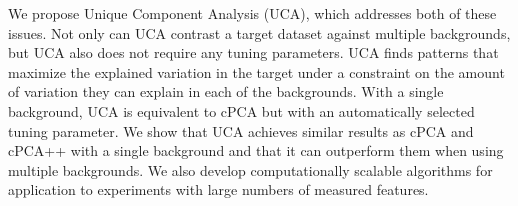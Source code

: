 \documentclass[12pt]{article}
\begin{document}
We propose Unique Component Analysis (UCA), which addresses both of these issues. %
Not only can UCA contrast a target dataset against multiple backgrounds, but UCA also does not require any tuning parameters. UCA finds patterns that maximize the explained variation in the target under a constraint on the amount of variation they can explain in each of the backgrounds. With a single background, UCA is equivalent to cPCA but with an automatically selected tuning parameter. We show that UCA achieves similar results as cPCA and cPCA++ with a single background and that it can outperform them when using multiple backgrounds. We also develop computationally scalable algorithms for application to experiments with large numbers of measured features.
\end{document}
